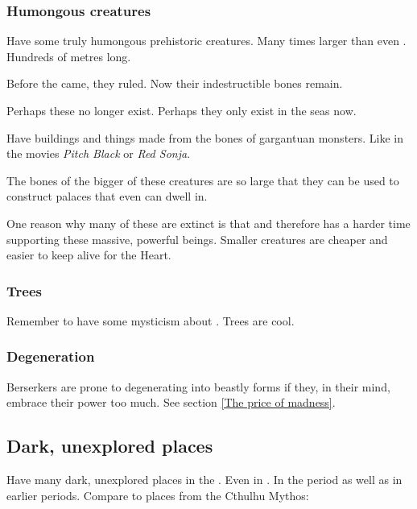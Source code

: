 \subsubsection{Humongous creatures}
Have some truly humongous prehistoric creatures. 
Many times larger than even \dragons. 
Hundreds of metres long. 

Before the \ophidians{} came, they ruled. 
Now their indestructible bones remain. 

Perhaps these no longer exist. 
Perhaps they only exist in the seas now. 

Have buildings and things made from the bones of gargantuan monsters. 
Like in the movies \emph{Pitch Black} or \emph{Red Sonja}. 

The bones of the bigger of these creatures are so large that they can be used to construct palaces that even \dragons{} can dwell in. 

One reason why many of these are extinct is that  and therefore has a harder time supporting these massive, powerful beings. 
Smaller creatures are cheaper and easier to keep alive for the Heart. 





\subsubsection{Trees}
Remember to have some mysticism about . Trees are cool. 





\subsubsection{Degeneration}
Berserkers are prone to degenerating into beastly forms if they, in their mind, embrace their \Wylde{} power too much. See section \ref{The price of madness}. 









\subsection{Dark, unexplored places}
Have many dark, unexplored  places in the \wylde. 
Even in \Velcad. 
In the \thirdbanewar period as well as in earlier periods. 
Compare to places from the Cthulhu Mythos:

